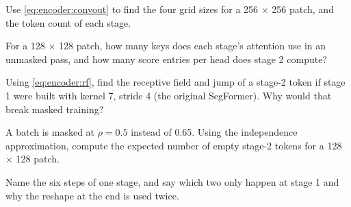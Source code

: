 \begin{checkyourself}
\item\label{ex:encoder:1} Use \cref{eq:encoder:convout} to find the four grid sizes for a 256
$\times$ 256 patch, and the token count of each stage.
\item\label{ex:encoder:2} For a 128 $\times$ 128 patch, how many keys does each stage's attention use
in an unmasked pass, and how many score entries per head does stage 2 compute?
\item\label{ex:encoder:3} Using \cref{eq:encoder:rf}, find the receptive field and jump of a stage-2
token if stage 1 were built with kernel 7, stride 4 (the original SegFormer). Why would that break
masked training?
\item\label{ex:encoder:4} A batch is masked at $\rho = 0.5$ instead of 0.65. Using the independence
approximation, compute the expected number of empty stage-2 tokens for a 128 $\times$ 128 patch.
\item\label{ex:encoder:5} Name the six steps of one stage, and say which two only happen at stage 1 and
why the reshape at the end is used twice.
\end{checkyourself}

